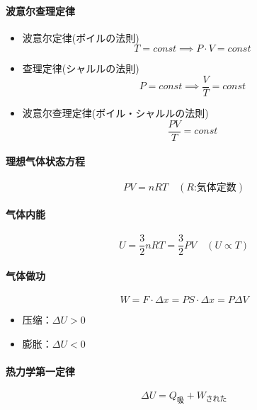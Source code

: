 \paragraph{波意尔查理定律}
\begin{itemize}
    \item 波意尔定律(ボイルの法則)
    \begin{equation*}
        T=const\implies P\cdot V=const
    \end{equation*}
    \item 查理定律(シャルルの法則)
    \begin{equation*}
        P=const\implies\frac{V}{T}=const
    \end{equation*}
    \item 波意尔查理定律(ボイル・シャルルの法則)
    \begin{equation*}
        \frac{PV}{T}=const
    \end{equation*}
\end{itemize}

\paragraph{理想气体状态方程}
\begin{equation*}
    PV=nRT\quad(R\textrm{:気体定数})
\end{equation*}

\paragraph{气体内能}
\begin{equation*}
    U=\frac32nRT=\frac32PV\quad(U\propto T)
\end{equation*}

\paragraph{气体做功}
\begin{equation*}
    W=F\cdot\Delta x=PS\cdot\Delta x=P\Delta V
\end{equation*}
\begin{itemize}
    \item 压缩：$\Delta U>0$
    \item 膨胀：$\Delta U<0$
\end{itemize}

\paragraph{热力学第一定律}
\begin{equation*}
    \Delta U=Q_\textrm{吸}+W_\textrm{された}
\end{equation*}


